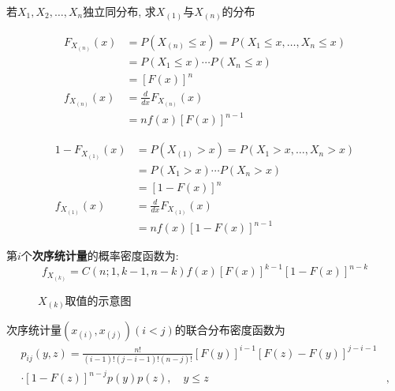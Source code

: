\begin{example}
    若$X_1,X_2,\dotsc,X_n$独立同分布, 求$X_{(1)}$与$X_{(n)}$的分布

    \begin{align*}
        F_{X_{(n)}}(x) & =P(X_{(n)} \leq x)=P(X_{1} \leq x, \ldots, X_{n} \leq x) \\
                       & =P(X_{1} \leq x) \cdots P(X_{n} \leq x)                  \\
                       & =[F(x)]^{n}                                              \\
        f_{X_{(n)}}(x) & = \frac{d}{dx}F_{X_{(n)}}(x)                             \\
                       & =nf(x)[F(x)]^{n-1}
    \end{align*}

    \begin{align*}
        1-F_{X_{(1)}}(x) & =P(X_{(1)}>x)=P(X_{1}>x, \ldots, X_{n}>x) \\
                         & =P(X_{1}>x)\cdots P(X_{n}>x)              \\
                         & =[1-F(x)]^{n}                             \\
        f_{X_{(1)}}(x)   & = \frac{d}{dx}F_{X_{(1)}}(x)              \\
                         & =nf(x)[1-F(x)]^{n-1}
    \end{align*}
\end{example}

\begin{theorem}
    第$i$个\textbf{次序统计量}的概率密度函数为:
    \[ f_{X_{(k)}} = C(n;1,k-1,n-k)f(x)[F(x)]^{k-1}[1-F(x)]^{n-k}  \]
\end{theorem}

\begin{figure}[!ht]
    \centering
    \caption{$X_{(k)}$取值的示意图}
\end{figure}

\begin{theorem}
    次序统计量$(x_{(i)},x_{(j)})(i<j)$的联合分布密度函数为
    \begin{align*}
        p_{ij}(y,z)=\frac{n!}{(i-1)!(j-i-1)!(n-j)!}[F(y)]^{i-1}[F(z)-F(y)]^{j-i-1} &   \\
        \cdot[1-F(z)]^{n-j}p(y)p(z),\quad y\leq z                                  & ,
    \end{align*}
\end{theorem}

